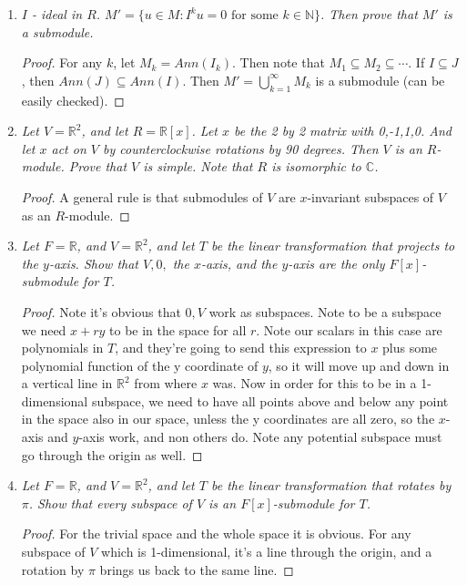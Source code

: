 \documentclass[9pt,reqno,twoside]{amsbook}
\theoremstyle{plain}
\numberwithin{section}{chapter}
\numberwithin{equation}{chapter}
\theoremstyle{definition}
\theoremstyle{remark}
\theoremstyle{plain}
\newcommand{\sub}{\subseteq}
\newcommand{\R}{\mathbb{R}}
\newcommand{\n}{\mathbb{N}}
\begin{document}
\begin{enumerate}[label=\arabic*.]
\begin{enumerate}
\end{enumerate}

\item \textit{$I$ - ideal in $R$. $M' = \{u \in M: I^ku = 0 \text{ for some }k \in \n\}$. Then prove that $M'$ is a submodule. }

\begin{proof}
For any $k$, let $M_k = Ann(I_k)$. Then note that $M_1 \sub M_2 \sub \cdots$. If $I \sub J$, then $Ann(J) \sub Ann(I)$. Then $M' = \bigcup_{k = 1}^\infty M_k$ is a submodule (can be easily checked). 
\end{proof}

\setcounter{enumi}{17}

\item \textit{Let $V = \R^2$, and let $R = \R[x]$. Let $x$ be the 2 by 2 matrix with 0,-1,1,0. And let $x$ act on $V$ by counterclockwise rotations by 90 degrees. Then $V$ is an $R$-module. Prove that $V$ is simple. Note that $R$ is isomorphic to $\mathbb{C}$. }

\begin{proof}
A general rule is that submodules of $V$ are $x$-invariant subspaces of $V$ as an $R$-module. 
\end{proof}

\item \textit{Let $F = \R$, and $V = \R^2$, and let $T$ be the linear transformation that projects to the $y$-axis. Show that $V,0,$ the $x$-axis, and the $y$-axis are the only $F[x]$-submodule for $T$. }

\begin{proof}
Note it's obvious that $0,V$ work as subspaces. Note to be a subspace we need $x + ry$ to be in the space for all $r$. Note our scalars in this case are polynomials in $T$, and they're going to send this expression to $x$ plus some polynomial function of the y coordinate of $y$, so it will move up and down in a vertical line in $\R^2$ from where $x$ was. Now in order for this to be in a 1-dimensional subspace, we need to have all points above and below any point in the space also in our space, unless the y coordinates are all zero, so the $x$-axis and $y$-axis work, and non others do. Note any potential subspace must go through the origin as well. 
\end{proof}

\item \textit{Let $F = \R$, and $V = \R^2$, and let $T$ be the linear transformation that rotates by $\pi$. Show that every subspace of $V$ is an $F[x]$-submodule for $T$. }

\begin{proof}
For the trivial space and the whole space it is obvious. For any subspace of $V$ which is 1-dimensional, it's a line through the origin, and a rotation by $\pi$ brings us back to the same line. 
\end{proof}










\end{enumerate}
\end{document}
